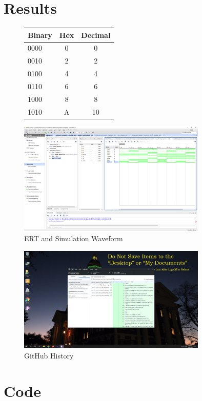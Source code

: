 \documentclass[11pt]{article}
\newcommand{\Verilog}[2][]{%
	
}
\begin{document}
\section*{Results}
\clearpage
\begin{figure}\centering
	\begin{tabular}{l|c|c}
		Binary & Hex & Decimal \\
		\midrule
		0000 & 0 & 0 \\
		0010 & 2 & 2 \\
		0100 & 4 & 4 \\
		0110 & 6 & 6 \\
		1000 & 8 & 8 \\
		1010 & A & 10 \\
		\bottomrule
	\end{tabular} 
	
	\includegraphics[width=0.8\textwidth,trim=18.7cm 15.3cm 0cm 4.4cm,clip]{lab1_example_screenshot}
	\caption{ERT and Simulation Waveform}
	\label{fig:sim_with_table_lab1}
\end{figure}

\begin{figure}[ht]\centering
	\includegraphics[width=0.8\textwidth,trim=16.9cm 8.06cm 16.9cm 9.45cm,clip]{Screenshot_GitHub}
	\caption{GitHub History}
	\label{fig:GitHub_Screenshot}			
\end{figure}

\clearpage

\section*{Code}

\Verilog[caption=Lab 1 Code,label=code:lab 1]{lab1_example_code.sv}
\end{document}
